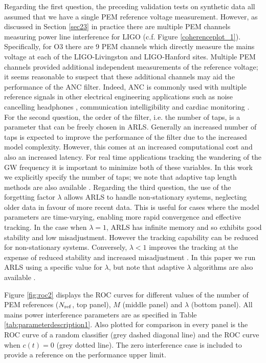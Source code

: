 \documentclass[pra,superscriptaddress,reprint,amsmath,amssymb,nofootinbib]{revtex4-2}
\begin{document}
Regarding the first question, the preceding validation tests on synthetic data all assumed that we have a single PEM reference voltage measurement. However, as discussed in Section \ref{sec23} in practice there are multiple PEM channels measuring power line interference for LIGO (c.f. Figure \ref{coherenceplot_1}). Specifically, for O3 there are 9 PEM channels which directly measure the mains voltage at each of the LIGO-Livingston and LIGO-Hanford sites. Multiple PEM channels provided additional independent measurements of the reference voltage; it seems reasonable to suspect that these additional channels may aid the performance of the ANC filter. Indeed, ANC is commonly used with multiple reference signals in other electrical engineering applications such as noise cancelling headphones \citep{10.1121/1.5109394}, communication intelligibility \citep{KUO1996669,doi:10.1177/1084713812456906} and cardiac monitoring \citep{7755741}. For the second question, the order of the filter, i.e. the number of taps, is a parameter that can be freely chosen in ARLS. Generally an increased number of taps is expected to improve the performance of the filter due to the increased model complexity. However, this comes at an increased computational cost and also an increased latency. For real time applications tracking the wandering of the GW frequency it is important to minimize both of these variables. In this work we explicitly specify the number of taps; we note that adaptive tap length methods are also available \citep[e.g.][]{1326385,KAR2017422,KAR2020107043}. Regarding the third question, the use of the forgetting factor $\lambda$ allows ARLS to handle non-stationary systems, neglecting older data in favour of more recent data. This is useful for cases where the model parameters are time-varying, enabling more rapid convergence and effective tracking. In the case when $\lambda = 1$, ARLS has infinite memory and so exhibits good stability and low misadjustment. However the tracking capability can be reduced for non-stationary systems. Conversely, $\lambda < 1$ improves the tracking at the expense of reduced stability and increased misadjustment \citep{Ciochina5206117}. In this paper we run ARLS using a specific value for $\lambda$, but note that adaptive $\lambda$ algorithms are also available \citep{app12042077,1468506,4639569}. \newline 



Figure \ref{fig:roc2} displays the ROC curves for different values of the number of PEM references ($N_{\rm ref}$, top panel), $M$ (middle panel) and $\lambda$ (bottom panel). All mains power interference parameters are as specified in Table \ref{tab:parameterdescription1}. Also plotted for comparison in every panel is the ROC curve of a random classifier (grey dashed diagonal line) and the ROC curve when $c(t) = 0$ (grey dotted line). The zero interference case is included to provide a reference on the performance upper limit. \newline 
\end{document}
